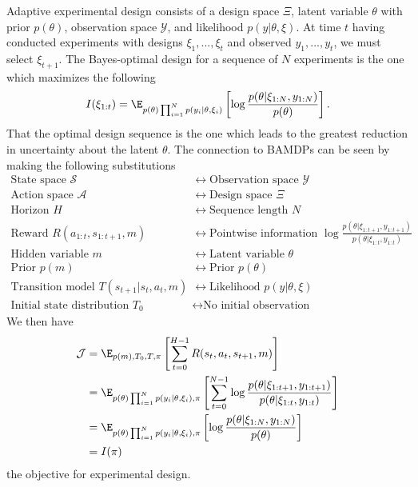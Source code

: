 Adaptive experimental design consists of a design space $\Xi$, latent variable $\theta$ with prior $p(\theta)$, observation space $\mathcal{Y}$, and likelihood $p(y|\theta,\xi)$. At time $t$ having conducted experiments with designs $\xi_1, ..., \xi_t$ and observed $y_1, ..., y_t$, we must select $\xi_{t+1}$. The Bayes-optimal design for a sequence of $N$ experiments is the one which maximizes the following
\begin{equation}
	I(\xi_{1:t}) = \E_{p(\theta)\prod_{i=1}^N p(y_i|\theta,\xi_i)}\left[ \log \frac{p(\theta|\xi_{1:N},y_{1:N})}{p(\theta)} \right].
\end{equation}
That the optimal design sequence is the one which leads to the greatest reduction in uncertainty about the latent $\theta$. The connection to BAMDPs can be seen by making the following substitutions
\begin{align}
	\text{State space } \mathcal{S} &\leftrightarrow \text{Observation space } \mathcal{Y} \\
	\text{Action space } \mathcal{A} &\leftrightarrow \text{Design space } \Xi \\
	\text{Horizon } H &\leftrightarrow \text{Sequence length } N \\
	\text{Reward } R(a_{1:t},s_{1:t+1},m) &\leftrightarrow \text{Pointwise information }\log \frac{p(\theta|\xi_{1:t+1},y_{1:t+1})}{p(\theta|\xi_{1:t},y_{1:t})} \\
	\text{Hidden variable } m &\leftrightarrow \text{Latent variable } \theta \\
	\text{Prior } p(m) &\leftrightarrow \text{Prior } p(\theta) \\
	\text{Transition model } T(s_{t+1}|s_t, a_t, m) &\leftrightarrow \text{Likelihood } p(y|\theta,\xi) \\
	\text{Initial state distribution } T_0 &\leftrightarrow \text{No initial observation}
\end{align}
We then have
\begin{align}
	\mathcal{J} &= \E_{p(m), T_0, T, \pi}\left[ \sum_{t=0}^{H-1} R(s_t,a_t,s_{t+1},m) \right] \\
	&= \E_{p(\theta)\prod_{i=1}^N p(y_i|\theta,\xi_i), \pi}\left[ \sum_{t=0}^{N-1} \log \frac{p(\theta|\xi_{1:t+1},y_{1:t+1})}{p(\theta|\xi_{1:t},y_{1:t})} \right] \\
	&= \E_{p(\theta)\prod_{i=1}^N p(y_i|\theta,\xi_i), \pi}\left[  \log \frac{p(\theta|\xi_{1:N},y_{1:N})}{p(\theta)} \right] \\
	&= I(\pi)
\end{align}
the objective for experimental design.

